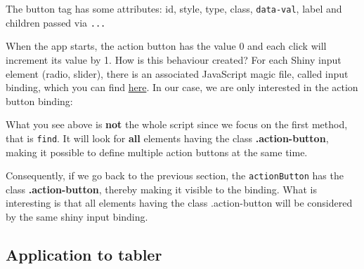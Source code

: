 \documentclass[]{book}
\newenvironment{Shaded}{\begin{snugshade}}{\end{snugshade}}
\newcommand{\AttributeTok}[1]{\textcolor[rgb]{0.77,0.63,0.00}{#1}}
\newcommand{\CommentTok}[1]{\textcolor[rgb]{0.56,0.35,0.01}{\textit{#1}}}
\newcommand{\ControlFlowTok}[1]{\textcolor[rgb]{0.13,0.29,0.53}{\textbf{#1}}}
\newcommand{\DataTypeTok}[1]{\textcolor[rgb]{0.13,0.29,0.53}{#1}}
\newcommand{\DecValTok}[1]{\textcolor[rgb]{0.00,0.00,0.81}{#1}}
\newcommand{\KeywordTok}[1]{\textcolor[rgb]{0.13,0.29,0.53}{\textbf{#1}}}
\newcommand{\NormalTok}[1]{#1}
\newcommand{\OperatorTok}[1]{\textcolor[rgb]{0.81,0.36,0.00}{\textbf{#1}}}
\newcommand{\StringTok}[1]{\textcolor[rgb]{0.31,0.60,0.02}{#1}}
\newcommand{\VariableTok}[1]{\textcolor[rgb]{0.00,0.00,0.00}{#1}}
\begin{document}
The button tag has some attributes: id, style, type, class, \texttt{data-val}, label and children passed via \texttt{...}

When the app starts, the action button has the value 0 and each click will increment its value by 1. How is this behaviour created? For each Shiny input element (radio, slider), there is an associated JavaScript magic file, called input binding, which you can find \href{https://github.com/rstudio/shiny/tree/master/srcjs}{here}. In our case, we are only interested in the action button binding:

\begin{Shaded}
\end{Shaded}

What you see above is \textbf{not} the whole script since we focus on the first method, that is \texttt{find}. It will look for \textbf{all} elements having the class \textbf{.action-button}, making it possible to define multiple action buttons at the same time.

Consequently, if we go back to the previous section, the \texttt{actionButton} has the class \textbf{.action-button}, thereby making it visible to the binding. What is interesting is that all elements having the class .action-button will be considered by the same shiny input binding.

\hypertarget{application-to-tabler}{%
\subsection{Application to tabler}\label{application-to-tabler}}
\end{document}
